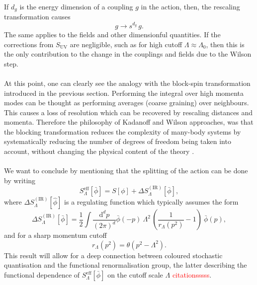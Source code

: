 If $d_g$ is the energy dimension of a coupling $g$ in the action, then, the rescaling transformation causes 
\begin{equation*} 
    g \to s^{d_g} \, g.
\end{equation*}
The same applies to the fields and other dimensionful quantities. If the corrections from $S_\text{UV}$ are negligible, such as for high cutoff $\Lambda \approx \Lambda_0$, then this is the only contribution to the change in the couplings and fields due to the Wilson step.  \\~\\
At this point, one can clearly see the analogy with the block-spin transformation introduced in the previous section. Performing the integral over high momenta modes
can be thought as performing averages (coarse graining) over neighbours. This causes a loss of resolution which can be recovered by rescaling distances and momenta. Therefore the philosophy of Kadanoff and Wilson approaches, was that the blocking transformation reduces the complexity of many-body systems by systematically reducing the number of degrees of freedom being taken into account, without changing the physical content of the
theory \cite{WILSON197475}. \\~\\
We want to conclude by mentioning that the splitting of the action can be done by writing
\begin{equation*}
    S^\text{eff}_\Lambda[\bar\phi] = S[\phi] + \Delta S_{\Lambda}^{(\mathrm{IR})}[\bar\phi],
\end{equation*}
where $\Delta S_{\Lambda}^{(\mathrm{IR})}[\hat{\phi}]$ is a regulating function which typically assumes the form
\begin{equation} 
    \Delta S_{\Lambda}^{(\mathrm{IR})}[\bar\phi] = \frac{1}{2} \int \frac{\mathrm{d}^d p}{(2 \pi)^d} \bar\phi(-p) \ \Lambda^2 \, \left(\frac{1}{r_{\Lambda}(p^2)}-1\right) \ \bar\phi(p),
\end{equation}
and for a sharp momentum cutoff 
\begin{equation*}
    r_{\Lambda}(p^2) = \theta\left(p^2-\Lambda^2\right).
\end{equation*}
This result will allow for a deep connection between coloured stochastic quantisation and the functional renormalisation group, the latter describing the functional dependence of $S_\Lambda^\text{eff}[\bar\phi]$ on the cutoff scale $\Lambda$ \textcolor{red}{citationsssss}.


